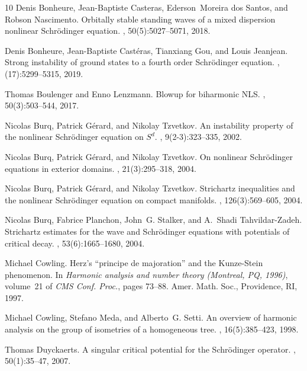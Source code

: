 \documentclass[10pt,leqno]{amsart}
\numberwithin{equation}{section}
\begin{document}
\begin{thebibliography}{10}
Denis Bonheure, Jean-Baptiste Casteras, Ederson~Moreira dos Santos, and Robson
  Nascimento.
\newblock Orbitally stable standing waves of a mixed dispersion nonlinear
  {S}chr\"{o}dinger equation.
, 50(5):5027--5071, 2018.

Denis Bonheure, Jean-Baptiste Cast\'{e}ras, Tianxiang Gou, and Louis Jeanjean.
\newblock Strong instability of ground states to a fourth order
  {S}chr\"{o}dinger equation.
, (17):5299--5315, 2019.

Thomas Boulenger and Enno Lenzmann.
\newblock Blowup for biharmonic {NLS}.
, 50(3):503--544, 2017.

Nicolas Burq, Patrick G\'{e}rard, and Nikolay Tzvetkov.
\newblock An instability property of the nonlinear {S}chr\"{o}dinger equation
  on {$S^d$}.
, 9(2-3):323--335, 2002.

Nicolas Burq, Patrick G\'{e}rard, and Nikolay Tzvetkov.
\newblock On nonlinear {S}chr\"{o}dinger equations in exterior domains.
,
  21(3):295--318, 2004.

Nicolas Burq, Patrick G\'{e}rard, and Nikolay Tzvetkov.
\newblock Strichartz inequalities and the nonlinear {S}chr\"{o}dinger equation
  on compact manifolds.
, 126(3):569--605, 2004.

Nicolas Burq, Fabrice Planchon, John~G. Stalker, and A.~Shadi Tahvildar-Zadeh.
\newblock Strichartz estimates for the wave and {S}chr\"{o}dinger equations
  with potentials of critical decay.
, 53(6):1665--1680, 2004.

Michael Cowling.
\newblock Herz's ``principe de majoration'' and the {K}unze-{S}tein phenomenon.
\newblock In {\em Harmonic analysis and number theory ({M}ontreal, {PQ},
  1996)}, volume~21 of {\em CMS Conf. Proc.}, pages 73--88. Amer. Math. Soc.,
  Providence, RI, 1997.

Michael Cowling, Stefano Meda, and Alberto~G. Setti.
\newblock An overview of harmonic analysis on the group of isometries of a
  homogeneous tree.
, 16(5):385--423, 1998.

Thomas Duyckaerts.
\newblock A singular critical potential for the {S}chr\"{o}dinger operator.
, 50(1):35--47, 2007.


\end{thebibliography}
\end{document}
